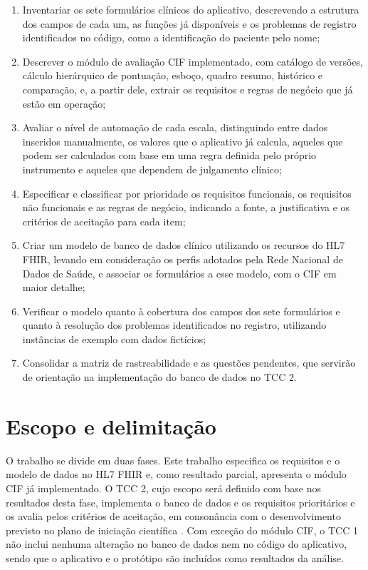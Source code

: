 \begin{enumerate}
	\item Inventariar os sete formulários clínicos do aplicativo, descrevendo a estrutura dos campos de cada um, as funções
	já disponíveis e os problemas de registro identificados no código, como a identificação do paciente pelo nome;
	\item Descrever o módulo de avaliação CIF implementado, com catálogo de versões, cálculo hierárquico de pontuação,
    esboço, quadro resumo, histórico e comparação, e, a partir dele, extrair os requisitos e regras de negócio que já
    estão em operação;
	\item Avaliar o nível de automação de cada escala, distinguindo entre dados inseridos manualmente, os valores que o aplicativo já
    calcula, aqueles que podem ser calculados com base em uma regra definida pelo próprio instrumento e aqueles que dependem de julgamento clínico;
	\item Especificar e classificar por prioridade os requisitos funcionais, os requisitos não funcionais e as regras de negócio, indicando a fonte,
    a justificativa e os critérios de aceitação para cada item;
	\item Criar um modelo de banco de dados clínico utilizando os recursos do HL7 FHIR, levando em consideração os perfis adotados pela
    Rede Nacional de Dados de Saúde, e associar os formulários a esse modelo, com o CIF em maior detalhe;
	\item Verificar o modelo quanto à cobertura dos campos dos sete formulários e quanto à resolução dos problemas identificados
    no registro, utilizando instâncias de exemplo com dados fictícios;
	\item Consolidar a matriz de rastreabilidade e as questões pendentes, que servirão de orientação na implementação do banco de dados no TCC 2.
\end{enumerate}

\section{Escopo e delimitação}

O trabalho se divide em duas fases. Este trabalho especifica os requisitos e o modelo de dados no HL7 FHIR e, como
  resultado parcial, apresenta o módulo CIF já implementado. O TCC 2, cujo escopo será definido com base nos resultados
  desta fase, implementa o banco de dados e os requisitos prioritários e os avalia pelos critérios de aceitação, em
  consonância com o desenvolvimento previsto no plano de iniciação científica \cite{ochoadiaz2026plano}. Com exceção do módulo CIF, o TCC 1 não inclui nenhuma alteração
  no
  banco de dados nem no código do aplicativo, sendo que o aplicativo e o protótipo são incluídos como
  resultados da análise.

